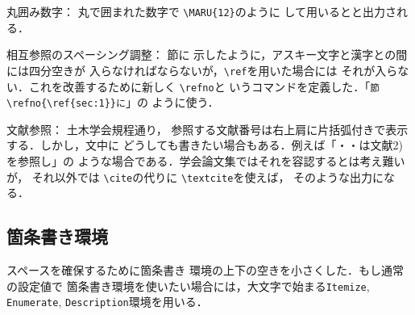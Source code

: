 \documentclass[onecolumn]{jsce}  %
\begin{document}
\begin{Description}
%
\item[　丸囲み数字：] 丸で囲まれた数字で \verb+\MARU{12}+のように
して用いるとと出力される．
%
\item[　相互参照のスペーシング調整：] 節に
示したように，アスキー文字と漢字との間には四分空きが
入らなければならないが，\verb+\ref+を用いた場合には
それが入らない．これを改善するために新しく \verb+\refno+と
いうコマンドを定義した．「\verb+節\refno{\ref{sec:1}}に+」の
ように使う．
%
\item[　文献参照：] 土木学会規程通り，
参照する文献番号は右上肩に片括弧付きで表示する．しかし，文中に
どうしても書きたい場合もある．例えば「・・は文献2)を参照し」の
ような場合である．学会論文集ではそれを容認するとは考え難いが，
それ以外では \verb+\cite+の代りに \verb+\textcite+を使えば，
そのような出力になる．
\end{Description}

\subsection{箇条書き環境}

スペースを確保するために箇条書き
環境の上下の空きを小さくした．もし通常の設定値で
箇条書き環境を使いたい場合には，大文字で始まる{\tt Itemize},
 {\tt Enumerate}, {\tt Description}環境を用いる．

\lastpagesettings
\end{document}
